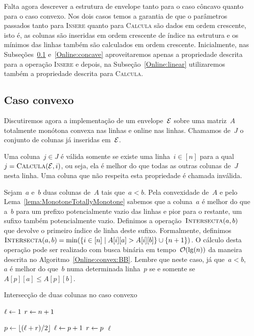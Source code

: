 Falta agora descrever a estrutura de envelope tanto para o caso côncavo quanto para o caso convexo. Nos dois casos temos a garantia de que o parâmetros passados tanto para \textsc{Insere} quanto para \textsc{Calcula} são dados em ordem crescente, isto é, as colunas são inseridas em ordem crescente de índice na estrutura e os mínimos das linhas também são calculados em ordem crescente. Inicialmente, nas Subseções~\ref{Online:convex} e~\ref{Online:concave} aproveitaremos apenas a propriedade descrita para a operação \textsc{Insere} e depois, na Subseção~\ref{Online:linear} utilizaremos também a propriedade descrita para \textsc{Calcula}.


\subsection{Caso convexo} \label{Online:convex}
Discutiremos agora a implementação de um envelope~$\mathcal{E}$ sobre uma matriz~$A$ totalmente monótona convexa nas linhas e online nas linhas. Chamamos de~$J$ o conjunto de colunas já inseridas em~$\mathcal{E}$.

\begin{defi}
Uma coluna~$j \in J$ é válida somente se existe uma linha~$i \in [n]$ para a qual~${j = \textsc{Calcula}(\mathcal{E},i)}$, ou seja, ela é melhor do que todas as outras colunas de~$J$ nesta linha. Uma coluna que não respeita esta propriedade é chamada inválida.
\end{defi}

Sejam~$a$ e~$b$ duas colunas de~$A$ tais que~$a < b$. Pela convexidade de~$A$ e pelo Lema~\ref{lema:MonotoneTotallyMonotone} sabemos que a coluna~$a$ é melhor do que a~$b$ para um prefixo potencialmente vazio das linhas e pior para o restante, um sufixo também potencialmente vazio. Definimos a operação~$\textsc{Intersecta}(a,b)$ que devolve o primeiro índice de linha deste sufixo. Formalmente, definimos~${\textsc{Intersecta}(a,b) = \min(\{ i \in [n] \mid A[i][a] > A[i][b] \} \cup \{n+1\})}$. O cálculo desta operação pode ser realizado com busca binária em tempo~$\mathcal{O}(\lg(n))$ da maneira descrita no Algoritmo~\ref{Online:convex:BB}. Lembre que neste caso, já que~$a < b$,~$a$ é melhor do que~$b$ numa determinada linha~$p$ se e somente se~${A[p][a] \leq A[p][b]}$.

\begin{algorithm}[h]
\caption{Intersecção de duas colunas no caso convexo}
\label{Online:convex:BB}
\begin{algorithmic}[1]
    \State $\ell \leftarrow 1$
    \State $r \leftarrow n+1$

        \State $p \leftarrow \lfloor(\ell + r)/2\rfloor$
         \label{Online:convex:BB:ineq}
            \State $\ell \leftarrow p + 1$
        \Else
            \State $r \leftarrow p$
        \EndIf
    \EndWhile
    \State \Return $\ell$
\EndFunction
\end{algorithmic}
\end{algorithm}

